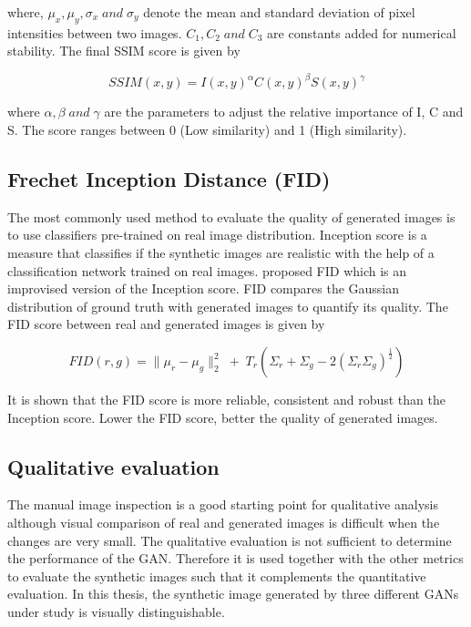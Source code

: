 	where, $\mu_x,\mu_y,\sigma_x \; and \; \sigma_y$ denote the mean and standard deviation of pixel intensities between two images. $C_1, C_2 \; and \; C_3$ are constants added for numerical stability. The final SSIM score \citep{wang2004image} is given by
	
\begin{equation*}
SSIM(x,y) = I(x,y)^\alpha C(x,y)^\beta S(x,y)^\gamma
\end{equation*}

	where $\alpha, \beta \; and \; \gamma$ are the parameters to adjust the relative importance of I, C and S. The score ranges between 0 (Low similarity) and 1 (High similarity).

\subsection*{Frechet Inception Distance (FID)}
	The most commonly used method to evaluate the quality of generated images is to use classifiers pre-trained on real image distribution. Inception score is a measure that classifies if the synthetic images are realistic with the help of a classification network trained on real images. \citeauthor{heusel2017gans} proposed FID which is an improvised version of the Inception score. FID compares the Gaussian distribution of ground truth with generated images to quantify its quality. The FID score between real and generated images \citep{heusel2017gans} is given by 

\begin{equation*}
FID(r,g) = \lVert{\mu_r - \mu_g}\lVert_2^2 \; +  \; T_r(\Sigma_r + \Sigma_g - 2(\Sigma_r\Sigma_g)^{\frac{1}{2}})
\end{equation*}
	
It is shown that the FID score is more reliable, consistent and robust than the Inception score. Lower the FID score, better the quality of generated images.

\subsection{Qualitative evaluation}
The manual image inspection is a good starting point for qualitative analysis although visual comparison of real and generated images is difficult when the changes are very small.
The qualitative evaluation is not sufficient to determine the performance of the GAN. Therefore it is used together with the other metrics to evaluate the synthetic images such that it complements the quantitative evaluation. In this thesis, the synthetic image generated by three different GANs under study is visually distinguishable.
